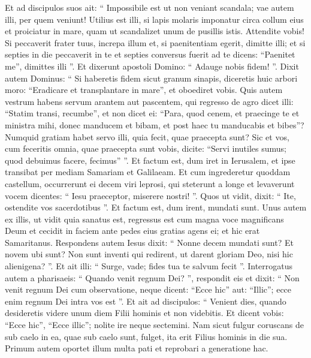 \begin{biblechapter}
\begin{biblechapter}
\begin{biblechapter}
\begin{biblechapter}
\begin{biblechapter}
\begin{biblechapter}
\begin{biblechapter}
\begin{biblechapter}
\begin{biblechapter}
\begin{biblechapter}
\begin{biblechapter}
\begin{biblechapter}
\begin{biblechapter}
\begin{biblechapter}
\begin{biblechapter}
\begin{biblechapter}
\begin{biblechapter}
\verse Et ad discipulos suos ait: “ Impossibile est ut non veniant scandala; vae autem illi, per quem veniunt! 
\verse Utilius est illi, si lapis molaris imponatur circa collum eius et proiciatur in mare, quam ut scandalizet unum de pusillis istis. 
\verse Attendite vobis!
 Si peccaverit frater tuus, increpa illum et, si paenitentiam egerit, dimitte illi; 
\verse et si septies in die peccaverit in te et septies conversus fuerit ad te dicens: “Paenitet me”, dimittes illi ”.
 \verse Et dixerunt apostoli Domino: “ Adauge nobis fidem! ”. 
\verse Dixit autem Dominus: “ Si haberetis fidem sicut granum sinapis, diceretis huic arbori moro: “Eradicare et transplantare in mare”, et oboediret vobis. 
\verse Quis autem vestrum habens servum arantem aut pascentem, qui regresso de agro dicet illi: “Statim transi, recumbe”, 
\verse et non dicet ei: “Para, quod cenem, et praecinge te et ministra mihi, donec manducem et bibam, et post haec tu manducabis et bibes”? 
\verse Numquid gratiam habet servo illi, quia fecit, quae praecepta sunt? 
 \verse Sic et vos, cum feceritis omnia, quae praecepta sunt vobis, dicite: “Servi inutiles sumus; quod debuimus facere, fecimus” ”.
 \verse Et factum est, dum iret in Ierusalem, et ipse transibat per mediam Samariam et Galilaeam. 
\verse Et cum ingrederetur quoddam castellum, occurrerunt ei decem viri leprosi, qui steterunt a longe 
\verse et levaverunt vocem dicentes: “ Iesu praeceptor, miserere nostri! ”. 
\verse Quos ut vidit, dixit: “ Ite, ostendite vos sacerdotibus ”. Et factum est, dum irent, mundati sunt. 
\verse Unus autem ex illis, ut vidit quia sanatus est, regressus est cum magna voce magnificans Deum 
\verse et cecidit in faciem ante pedes eius gratias agens ei; et hic erat Samaritanus. 
\verse Respondens autem Iesus dixit: “ Nonne decem mundati sunt? Et novem ubi sunt? 
\verse Non sunt inventi qui redirent, ut darent gloriam Deo, nisi hic alienigena? ”. 
\verse Et ait illi: “ Surge, vade; fides tua te salvum fecit ”.
 \verse Interrogatus autem a pharisaeis: “ Quando venit regnum Dei? ”, respondit eis et dixit: “ Non venit regnum Dei cum observatione, 
\verse neque dicent: “Ecce hic” aut: “Illic”; ecce enim regnum Dei intra vos est ”. 
\verse Et ait ad discipulos: “ Venient dies, quando desideretis videre unum diem Filii hominis et non videbitis. 
\verse Et dicent vobis: “Ecce hic”, “Ecce illic”; nolite ire neque sectemini. 
\verse Nam sicut fulgur coruscans de sub caelo in ea, quae sub caelo sunt, fulget, ita erit Filius hominis in die sua. 
\verse Primum autem oportet illum multa pati et reprobari a generatione hac. 

\end{biblechapter}
\end{biblechapter}
\end{biblechapter}
\end{biblechapter}
\end{biblechapter}
\end{biblechapter}
\end{biblechapter}
\end{biblechapter}
\end{biblechapter}
\end{biblechapter}
\end{biblechapter}
\end{biblechapter}
\end{biblechapter}
\end{biblechapter}
\end{biblechapter}
\end{biblechapter}
\end{biblechapter}
